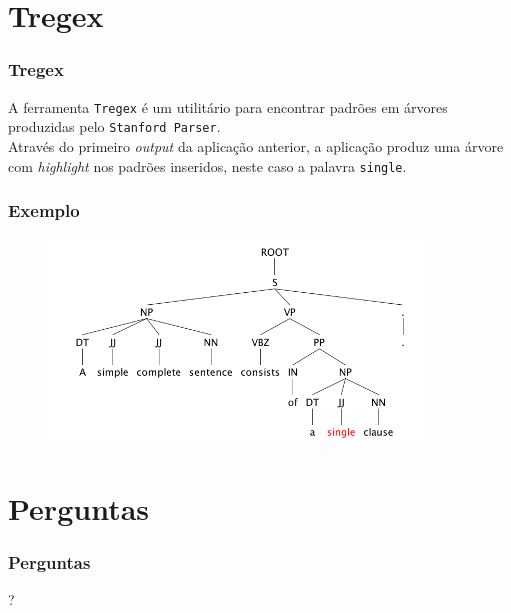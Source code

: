 \documentclass{beamer}
\begin{document}
\section{Tregex}
\begin{frame}\frametitle{Tregex}
 A ferramenta \texttt{Tregex} é um utilitário para encontrar padrões em árvores produzidas pelo \texttt{Stanford Parser}.\\

 Através do primeiro \emph{output} da aplicação anterior, a aplicação produz uma árvore com \emph{highlight} nos padrões inseridos, neste caso a palavra \texttt{single}.  
\end{frame}

\begin{frame}\frametitle{Exemplo}
\begin{figure}[htbp]
\begin{center}
\includegraphics[width=0.9\textwidth]{images/scr.png}
\end{center}
\end{figure}

\end{frame}


\section*{Perguntas}
\begin{frame} \frametitle{Perguntas}
\begin{center}\huge{?}\end{center}
\end{frame}
\end{document}
